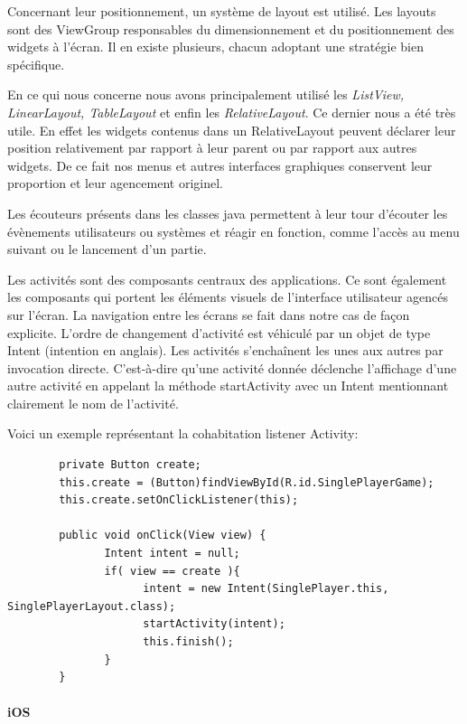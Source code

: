 		Concernant leur positionnement, un système de layout est utilisé. Les layouts sont des ViewGroup responsables
		du dimensionnement et du positionnement des widgets à l’écran. Il en existe plusieurs, 
		chacun adoptant une stratégie bien spécifique. 
		
		En ce qui nous concerne nous avons principalement utilisé les
		\textit{ListView, LinearLayout, TableLayout} et enfin les \textit{RelativeLayout}. Ce dernier nous a été très utile. En
		effet les widgets contenus dans un RelativeLayout peuvent déclarer leur position relativement
		par rapport à leur parent ou par rapport aux autres widgets. De ce fait nos
		menus et autres interfaces graphiques conservent leur proportion et leur
		agencement originel.		
		
		
		Les écouteurs présents dans les classes java permettent à leur tour d'écouter les évènements utilisateurs
		ou systèmes et réagir en fonction, comme l'accès au menu suivant ou le lancement
		d'un partie. 
		
		
		Les activités sont des composants centraux des applications. Ce sont également les
		composants qui portent les éléments visuels de l’interface utilisateur agencés
		sur l’écran. La navigation entre les écrans se fait dans notre cas de façon
		explicite. L’ordre de changement d’activité est véhiculé par un objet de type Intent (intention en anglais).
		Les activités s’enchaînent les unes aux autres par invocation directe.
		C’est-à-dire qu’une activité donnée déclenche l’affichage d’une autre activité 
		en appelant la méthode startActivity avec un Intent mentionnant clairement le nom
		de l’activité. 
		
		Voici un exemple représentant la cohabitation listener Activity:
		
		\begin{verbatim}
		private Button create;
		this.create = (Button)findViewById(R.id.SinglePlayerGame);
		this.create.setOnClickListener(this);
			
		public void onClick(View view) {
		       Intent intent = null;
		       if( view == create ){
		             intent = new Intent(SinglePlayer.this, SinglePlayerLayout.class);
		             startActivity(intent);
		             this.finish();
		       }
		}
		\end{verbatim}
		
		
		
		
		
		
	\paragraph{iOS\\}
		
